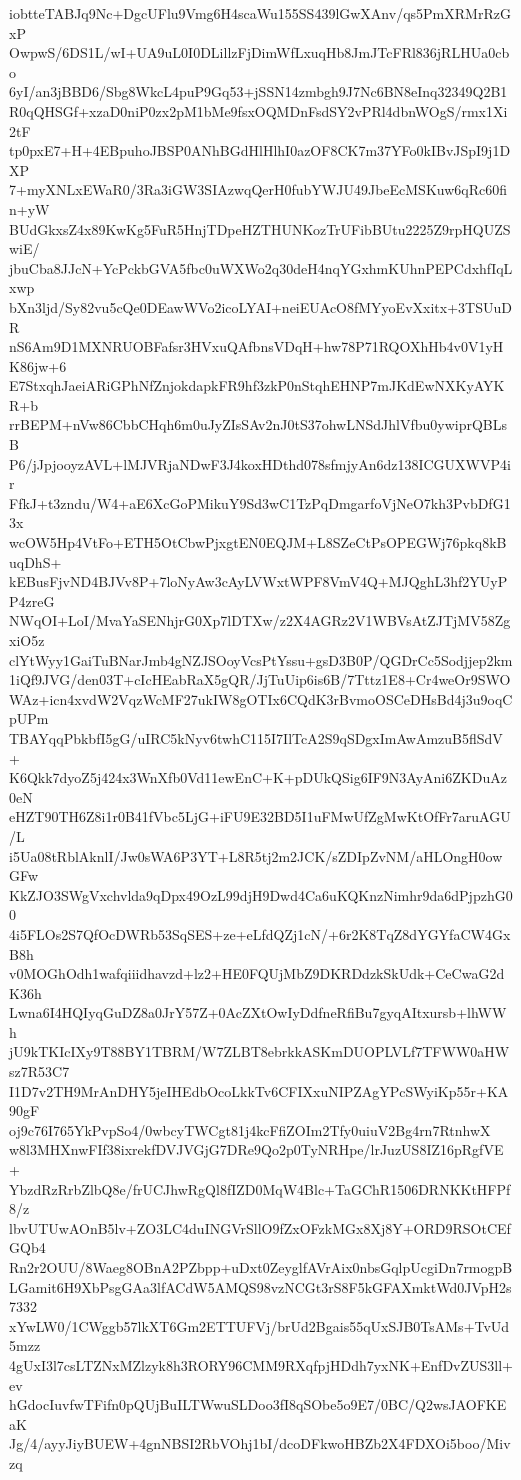iobtteTABJq9Nc+DgcUFlu9Vmg6H4scaWu155SS439lGwXAnv/qs5PmXRMrRzGxP
OwpwS/6DS1L/wI+UA9uL0I0DLillzFjDimWfLxuqHb8JmJTcFRl836jRLHUa0cbo
6yI/an3jBBD6/Sbg8WkcL4puP9Gq53+jSSN14zmbgh9J7Nc6BN8eInq32349Q2B1
R0qQHSGf+xzaD0niP0zx2pM1bMe9fsxOQMDnFsdSY2vPRl4dbnWOgS/rmx1Xi2tF
tp0pxE7+H+4EBpuhoJBSP0ANhBGdHlHlhI0azOF8CK7m37YFo0kIBvJSpI9j1DXP
7+myXNLxEWaR0/3Ra3iGW3SIAzwqQerH0fubYWJU49JbeEcMSKuw6qRc60fin+yW
BUdGkxsZ4x89KwKg5FuR5HnjTDpeHZTHUNKozTrUFibBUtu2225Z9rpHQUZSwiE/
jbuCba8JJcN+YcPckbGVA5fbc0uWXWo2q30deH4nqYGxhmKUhnPEPCdxhfIqLxwp
bXn3ljd/Sy82vu5cQe0DEawWVo2icoLYAI+neiEUAcO8fMYyoEvXxitx+3TSUuDR
nS6Am9D1MXNRUOBFafsr3HVxuQAfbnsVDqH+hw78P71RQOXhHb4v0V1yHK86jw+6
E7StxqhJaeiARiGPhNfZnjokdapkFR9hf3zkP0nStqhEHNP7mJKdEwNXKyAYKR+b
rrBEPM+nVw86CbbCHqh6m0uJyZIsSAv2nJ0tS37ohwLNSdJhlVfbu0ywiprQBLsB
P6/jJpjooyzAVL+lMJVRjaNDwF3J4koxHDthd078sfmjyAn6dz138ICGUXWVP4ir
FfkJ+t3zndu/W4+aE6XcGoPMikuY9Sd3wC1TzPqDmgarfoVjNeO7kh3PvbDfG13x
wcOW5Hp4VtFo+ETH5OtCbwPjxgtEN0EQJM+L8SZeCtPsOPEGWj76pkq8kBuqDhS+
kEBusFjvND4BJVv8P+7loNyAw3cAyLVWxtWPF8VmV4Q+MJQghL3hf2YUyPP4zreG
NWqOI+LoI/MvaYaSENhjrG0Xp7lDTXw/z2X4AGRz2V1WBVsAtZJTjMV58ZgxiO5z
clYtWyy1GaiTuBNarJmb4gNZJSOoyVcsPtYssu+gsD3B0P/QGDrCc5Sodjjep2km
1iQf9JVG/den03T+cIcHEabRaX5gQR/JjTuUip6is6B/7Tttz1E8+Cr4weOr9SWO
WAz+icn4xvdW2VqzWcMF27ukIW8gOTIx6CQdK3rBvmoOSCeDHsBd4j3u9oqCpUPm
TBAYqqPbkbfI5gG/uIRC5kNyv6twhC115I7IlTcA2S9qSDgxImAwAmzuB5flSdV+
K6Qkk7dyoZ5j424x3WnXfb0Vd11ewEnC+K+pDUkQSig6IF9N3AyAni6ZKDuAz0eN
eHZT90TH6Z8i1r0B41fVbc5LjG+iFU9E32BD5I1uFMwUfZgMwKtOfFr7aruAGU/L
i5Ua08tRblAknlI/Jw0sWA6P3YT+L8R5tj2m2JCK/sZDIpZvNM/aHLOngH0owGFw
KkZJO3SWgVxchvlda9qDpx49OzL99djH9Dwd4Ca6uKQKnzNimhr9da6dPjpzhG00
4i5FLOs2S7QfOcDWRb53SqSES+ze+eLfdQZj1cN/+6r2K8TqZ8dYGYfaCW4GxB8h
v0MOGhOdh1wafqiiidhavzd+lz2+HE0FQUjMbZ9DKRDdzkSkUdk+CeCwaG2dK36h
Lwna6I4HQIyqGuDZ8a0JrY57Z+0AcZXtOwIyDdfneRfiBu7gyqAItxursb+lhWWh
jU9kTKIcIXy9T88BY1TBRM/W7ZLBT8ebrkkASKmDUOPLVLf7TFWW0aHWsz7R53C7
I1D7v2TH9MrAnDHY5jeIHEdbOcoLkkTv6CFIXxuNIPZAgYPcSWyiKp55r+KA90gF
oj9c76I765YkPvpSo4/0wbcyTWCgt81j4kcFfiZOIm2Tfy0uiuV2Bg4rn7RtnhwX
w8l3MHXnwFIf38ixrekfDVJVGjG7DRe9Qo2p0TyNRHpe/lrJuzUS8IZ16pRgfVE+
YbzdRzRrbZlbQ8e/frUCJhwRgQl8fIZD0MqW4Blc+TaGChR1506DRNKKtHFPf8/z
lbvUTUwAOnB5lv+ZO3LC4duINGVrSllO9fZxOFzkMGx8Xj8Y+ORD9RSOtCEfGQb4
Rn2r2OUU/8Waeg8OBnA2PZbpp+uDxt0ZeyglfAVrAix0nbsGqlpUcgiDn7rmogpB
LGamit6H9XbPsgGAa3lfACdW5AMQS98vzNCGt3rS8F5kGFAXmktWd0JVpH2s7332
xYwLW0/1CWggb57lkXT6Gm2ETTUFVj/brUd2Bgais55qUxSJB0TsAMs+TvUd5mzz
4gUxI3l7csLTZNxMZlzyk8h3RORY96CMM9RXqfpjHDdh7yxNK+EnfDvZUS3ll+ev
hGdocIuvfwTFifn0pQUjBuILTWwuSLDoo3fI8qSObe5o9E7/0BC/Q2wsJAOFKEaK
Jg/4/ayyJiyBUEW+4gnNBSI2RbVOhj1bI/dcoDFkwoHBZb2X4FDXOi5boo/Mivzq
